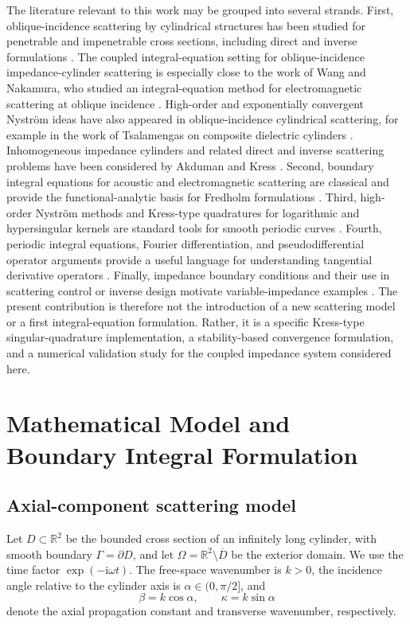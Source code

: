 \documentclass[11pt]{article}
\numberwithin{equation}{section}
\newcommand{\ii}{\mathrm{i}}
\newcommand{\RR}{\mathbb{R}}
\begin{document}
The literature relevant to this work may be grouped into several strands. First, oblique-incidence scattering by cylindrical structures has been studied for penetrable and impenetrable cross sections, including direct and inverse formulations \cite{gintides2020,mindrinos2018,gintides2017}. The coupled integral-equation setting for oblique-incidence impedance-cylinder scattering is especially close to the work of Wang and Nakamura, who studied an integral-equation method for electromagnetic scattering at oblique incidence \cite{wang2012}. High-order and exponentially convergent Nystr\"om ideas have also appeared in oblique-incidence cylindrical scattering, for example in the work of Tsalamengas on composite dielectric cylinders \cite{tsalamengas2007}. Inhomogeneous impedance cylinders and related direct and inverse scattering problems have been considered by Akduman and Kress \cite{akduman2003}. Second, boundary integral equations for acoustic and electromagnetic scattering are classical and provide the functional-analytic basis for Fredholm formulations \cite{colton1983,colton1998,mclean2000,nedelec2001}. Third, high-order Nystr\"om methods and Kress-type quadratures for logarithmic and hypersingular kernels are standard tools for smooth periodic curves \cite{nystrom1930,kress1995,kress2014,atkinson1997}. Fourth, periodic integral equations, Fourier differentiation, and pseudodifferential operator arguments provide a useful language for understanding tangential derivative operators \cite{saranen2002}. Finally, impedance boundary conditions and their use in scattering control or inverse design motivate variable-impedance examples \cite{senior1995,akduman2003,cakoni2006}. The present contribution is therefore not the introduction of a new scattering model or a first integral-equation formulation. Rather, it is a specific Kress-type singular-quadrature implementation, a stability-based convergence formulation, and a numerical validation study for the coupled impedance system considered here.

\section{Mathematical Model and Boundary Integral Formulation}

\subsection{Axial-component scattering model}

Let $D\subset\RR^2$ be the bounded cross section of an infinitely long cylinder, with smooth boundary $\Gamma=\partial D$, and let $\Omega=\RR^2\setminus\overline D$ be the exterior domain. We use the time factor $\exp(-\ii\omega t)$. The free-space wavenumber is $k>0$, the incidence angle relative to the cylinder axis is $\alpha\in(0,\pi/2]$, and
\begin{equation}
\beta=k\cos\alpha,\qquad \kappa=k\sin\alpha
\end{equation}
denote the axial propagation constant and transverse wavenumber, respectively.
\end{document}
